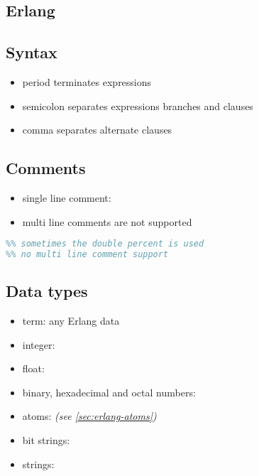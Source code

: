 \documentclass[a4paper,landscape,10pt]{article}
\begin{document}
\clearpage

\begin{multicols*}{2}

  \section{Erlang}

  \subsection{Syntax}

  \begin{itemize}
    \item period  terminates expressions
    \item semicolon \ierlang{;} separates expressions branches and clauses
    \item comma \ierlang{,} separates alternate clauses
  \end{itemize}

  \subsection{Comments}

  \begin{itemize}
    \item single line comment: \ierlang{\%}
    \item multi line comments are not supported
  \end{itemize}

  \begin{lstlisting}[language=Erlang]
% single line comment
%% sometimes the double percent is used
%% no multi line comment support
\end{lstlisting}

  \subsection{Data types}

  \begin{itemize}
    \item term: any Erlang data
    \item integer: 
    \item float: 
    \item binary, hexadecimal and octal numbers: 
    \item atoms:  \textit{(see \ref{sec:erlang-atoms})}
    \item bit strings: 
    \item strings: 
  \end{itemize}


\end{multicols*}
\end{document}
